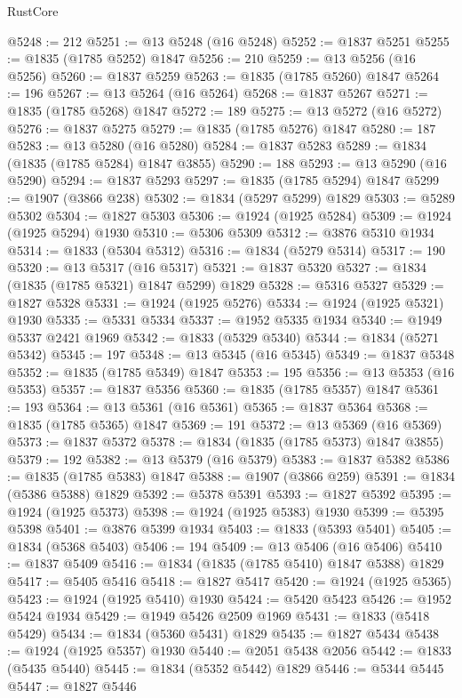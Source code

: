 \begin{lexlean}{RustCore}
\begin{coremodule}
@5248 := 212
@5251 := @13 @5248 (@16 @5248)
@5252 := @1837 @5251
@5255 := @1835 (@1785 @5252) @1847
@5256 := 210
@5259 := @13 @5256 (@16 @5256)
@5260 := @1837 @5259
@5263 := @1835 (@1785 @5260) @1847
@5264 := 196
@5267 := @13 @5264 (@16 @5264)
@5268 := @1837 @5267
@5271 := @1835 (@1785 @5268) @1847
@5272 := 189
@5275 := @13 @5272 (@16 @5272)
@5276 := @1837 @5275
@5279 := @1835 (@1785 @5276) @1847
@5280 := 187
@5283 := @13 @5280 (@16 @5280)
@5284 := @1837 @5283
@5289 := @1834 (@1835 (@1785 @5284) @1847 @3855)
@5290 := 188
@5293 := @13 @5290 (@16 @5290)
@5294 := @1837 @5293
@5297 := @1835 (@1785 @5294) @1847
@5299 := @1907 (@3866 @238)
@5302 := @1834 (@5297 @5299) @1829
@5303 := @5289 @5302
@5304 := @1827 @5303
@5306 := @1924 (@1925 @5284)
@5309 := @1924 (@1925 @5294) @1930
@5310 := @5306 @5309
@5312 := @3876 @5310 @1934
@5314 := @1833 (@5304 @5312)
@5316 := @1834 (@5279 @5314)
@5317 := 190
@5320 := @13 @5317 (@16 @5317)
@5321 := @1837 @5320
@5327 := @1834 (@1835 (@1785 @5321) @1847 @5299) @1829
@5328 := @5316 @5327
@5329 := @1827 @5328
@5331 := @1924 (@1925 @5276)
@5334 := @1924 (@1925 @5321) @1930
@5335 := @5331 @5334
@5337 := @1952 @5335 @1934
@5340 := @1949 @5337 @2421 @1969
@5342 := @1833 (@5329 @5340)
@5344 := @1834 (@5271 @5342)
@5345 := 197
@5348 := @13 @5345 (@16 @5345)
@5349 := @1837 @5348
@5352 := @1835 (@1785 @5349) @1847
@5353 := 195
@5356 := @13 @5353 (@16 @5353)
@5357 := @1837 @5356
@5360 := @1835 (@1785 @5357) @1847
@5361 := 193
@5364 := @13 @5361 (@16 @5361)
@5365 := @1837 @5364
@5368 := @1835 (@1785 @5365) @1847
@5369 := 191
@5372 := @13 @5369 (@16 @5369)
@5373 := @1837 @5372
@5378 := @1834 (@1835 (@1785 @5373) @1847 @3855)
@5379 := 192
@5382 := @13 @5379 (@16 @5379)
@5383 := @1837 @5382
@5386 := @1835 (@1785 @5383) @1847
@5388 := @1907 (@3866 @259)
@5391 := @1834 (@5386 @5388) @1829
@5392 := @5378 @5391
@5393 := @1827 @5392
@5395 := @1924 (@1925 @5373)
@5398 := @1924 (@1925 @5383) @1930
@5399 := @5395 @5398
@5401 := @3876 @5399 @1934
@5403 := @1833 (@5393 @5401)
@5405 := @1834 (@5368 @5403)
@5406 := 194
@5409 := @13 @5406 (@16 @5406)
@5410 := @1837 @5409
@5416 := @1834 (@1835 (@1785 @5410) @1847 @5388) @1829
@5417 := @5405 @5416
@5418 := @1827 @5417
@5420 := @1924 (@1925 @5365)
@5423 := @1924 (@1925 @5410) @1930
@5424 := @5420 @5423
@5426 := @1952 @5424 @1934
@5429 := @1949 @5426 @2509 @1969
@5431 := @1833 (@5418 @5429)
@5434 := @1834 (@5360 @5431) @1829
@5435 := @1827 @5434
@5438 := @1924 (@1925 @5357) @1930
@5440 := @2051 @5438 @2056
@5442 := @1833 (@5435 @5440)
@5445 := @1834 (@5352 @5442) @1829
@5446 := @5344 @5445
@5447 := @1827 @5446

\end{coremodule}
\end{lexlean}
